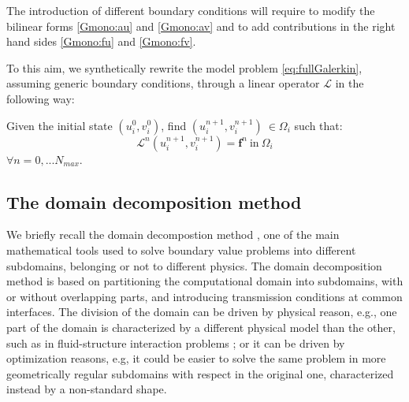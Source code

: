 The introduction of different boundary conditions will require to modify the bilinear forms \eqref{Gmono:au} and \eqref{Gmono:av} and to add contributions in the right hand sides \eqref{Gmono:fu} and \eqref{Gmono:fv}.

To this aim, we synthetically rewrite the model problem \eqref{eq:fullGalerkin}, assuming generic boundary conditions, through a linear operator $\mathcal{L}$ in the following way:

Given the initial state $(u_i^0, v_i^0)$, find $(u_i^{n+1}, v_i^{n+1}) \ \in \Omega_i$ such that:
\begin{equation}\label{eq:modelpb}
\mathcal{L}^n (u_i^{n+1}, v_i^{n+1}) = \mathbf{f}^n \ \text{in} \ \Omega_i
\end{equation}
$\forall n = 0, ... N_{max}$.

\subsection{The domain decomposition method}
We briefly recall the domain decompostion method \cite{DD:QuarteroniValli}, one of the main mathematical tools used to solve boundary value problems into different subdomains, belonging or not to different physics. The domain decomposition method is based on partitioning the computational domain into subdomains, with or without overlapping parts, and introducing transmission conditions at common interfaces. The division of the domain can be driven by physical reason, e.g., one part of the domain is characterized by a different physical model than the other, such as in fluid-structure interaction problems \cite{CV:RR2, CV:RR3}; or it can be driven by optimization reasons, e.g, it could be easier to solve the same problem in more geometrically regular subdomains with respect in the original one, characterized instead by a non-standard shape.

